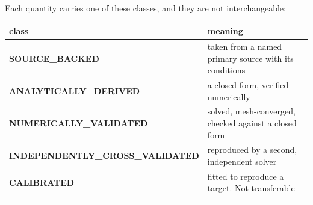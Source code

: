 \documentclass[10pt,]{article}
\begin{document}
Each quantity carries one of these classes, and they are not
interchangeable:

\begin{longtable}[]{@{}ll@{}}
\toprule
\begin{minipage}[b]{0.47\columnwidth}\raggedright
class\strut
\end{minipage} & \begin{minipage}[b]{0.47\columnwidth}\raggedright
meaning\strut
\end{minipage}\tabularnewline
\midrule
\endhead
\begin{minipage}[t]{0.47\columnwidth}\raggedright
\textbf{SOURCE\_BACKED}\strut
\end{minipage} & \begin{minipage}[t]{0.47\columnwidth}\raggedright
taken from a named primary source with its conditions\strut
\end{minipage}\tabularnewline
\begin{minipage}[t]{0.47\columnwidth}\raggedright
\textbf{ANALYTICALLY\_DERIVED}\strut
\end{minipage} & \begin{minipage}[t]{0.47\columnwidth}\raggedright
a closed form, verified numerically\strut
\end{minipage}\tabularnewline
\begin{minipage}[t]{0.47\columnwidth}\raggedright
\textbf{NUMERICALLY\_VALIDATED}\strut
\end{minipage} & \begin{minipage}[t]{0.47\columnwidth}\raggedright
solved, mesh-converged, checked against a closed form\strut
\end{minipage}\tabularnewline
\begin{minipage}[t]{0.47\columnwidth}\raggedright
\textbf{INDEPENDENTLY\_CROSS\_VALIDATED}\strut
\end{minipage} & \begin{minipage}[t]{0.47\columnwidth}\raggedright
reproduced by a second, independent solver\strut
\end{minipage}\tabularnewline
\begin{minipage}[t]{0.47\columnwidth}\raggedright
\textbf{CALIBRATED}\strut
\end{minipage} & \begin{minipage}[t]{0.47\columnwidth}\raggedright
fitted to reproduce a target. Not transferable\strut
\end{minipage}\tabularnewline
\begin{minipage}[t]{0.47\columnwidth}\raggedright

\end{minipage}
\end{longtable}
\end{document}
